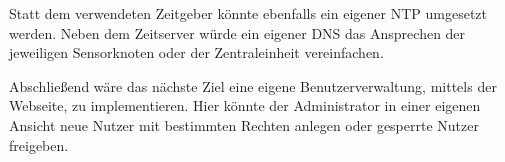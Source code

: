	Statt dem verwendeten Zeitgeber könnte ebenfalls ein eigener \ac{NTP} umgesetzt werden. Neben dem Zeitserver würde ein eigener \ac{DNS} das Ansprechen der jeweiligen Sensorknoten oder der Zentraleinheit vereinfachen.
	
	Abschließend wäre das nächste Ziel eine eigene Benutzerverwaltung, mittels der Webseite, zu implementieren. Hier könnte der Administrator in einer eigenen Ansicht neue Nutzer mit bestimmten Rechten anlegen oder gesperrte Nutzer freigeben.
